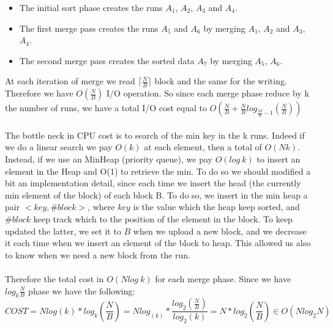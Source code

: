 \documentclass[a4paper]{article}
\begin{document}
\begin{itemize}
\item The initial sort phase creates the runs $A_1$, $A_2$, $A_3$ and $A_4$.
\item The first merge pass creates the runs $A_5$ and $A_6$ by merging $A_1$, $A_2$ and $A_3$,$A_4$.
\item The second merge pass creates the sorted data $A_7$ by merging $A_5$, $A_6$.
\end{itemize}
At each iteration of merge we read $\lceil \frac{N}{B} \rceil$ block and the same for the writing. Therefore we have $O(\frac{N}{B})$ I/O operation. So since each merge phase reduce by k the number of runs, we have a total I/O cost equal to $O(\frac{N}{B} + \frac{N}{B} log_{\frac{M}{B}-1}(\frac{N}{B}) )$
\\
\\
The bottle neck in CPU cost is to search of the min key in the k runs. Indeed if we do a linear search we pay $O(k)$ at each element, then a total of $O(Nk)$. Instead, if we use an MinHeap (priority queue), we pay $O(log \ k)$ to insert an element in the Heap and O(1) to retrieve the min. To do so we should modified a bit an implementation detail, since each time we insert the head (the currently min element of the block) of each block B. To do so, we insert in the min heap a pair $<key,\# block>$, where $key$ is the value which the heap keep sorted, and $\#block$ keep track which to the position of the element in the block. To keep updated the latter, we set it to $B$ when we upload a new block, and we decrease it each time when we insert an element of the block to heap. This allowed us also to know when we need a new block from the run. 
\\
\\
Therefore the total cost in $O(N log \ k)$ for each merge phase. Since we have $log_k \frac{N}{B}$ phase we have the following:
\begin{equation}
COST=N log(k)*log_k (\frac{N}{B})=N log_(k)*\frac{log_2 (\frac{N}{B})}{log_2 (k)}= N *log_2(\frac{N}{B}) \in O(Nlog_2 N) 
\nonumber
\end{equation} 
\end{document}
